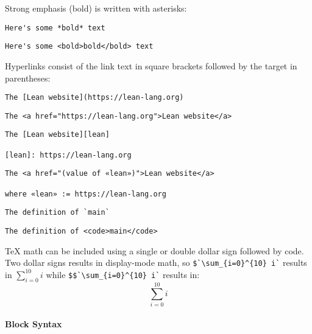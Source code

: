 \documentclass{memoir}
\begin{document}
Strong emphasis (bold) is written with asterisks:

\begin{verbatim}
Here's some *bold* text

\end{verbatim}
\begin{verbatim}
Here's some <bold>bold</bold> text

\end{verbatim}


Hyperlinks consist of the link text in square brackets followed by the target in parentheses:

\begin{verbatim}
The [Lean website](https://lean-lang.org)

\end{verbatim}
\begin{verbatim}
The <a href="https://lean-lang.org">Lean website</a>

\end{verbatim}


\begin{verbatim}
The [Lean website][lean]

[lean]: https://lean-lang.org

\end{verbatim}
\begin{verbatim}
The <a href="(value of «lean»)">Lean website</a>

where «lean» := https://lean-lang.org
\end{verbatim}


\begin{verbatim}
The definition of `main`

\end{verbatim}
\begin{verbatim}
The definition of <code>main</code>

\end{verbatim}


TeX math can be included using a single or double dollar sign followed by code. Two dollar signs results in display-mode math, so \verb|$`\sum_{i=0}^{10} i`| results in $\sum_{i=0}^{10} i$ while \verb|$$`\sum_{i=0}^{10} i`| results in: \[\sum_{i=0}^{10} i\]



\paragraph{Block Syntax}
\end{document}
